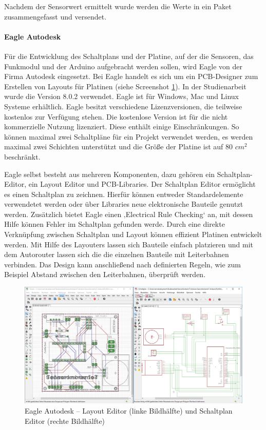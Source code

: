 Nachdem der Sensorwert ermittelt wurde werden die Werte in ein Paket zusammengefasst und versendet.  
\paragraph{Eagle Autodesk} Für die Entwicklung des Schaltplans und der Platine, auf der die Sensoren,  das Funkmodul und der Arduino aufgebracht werden sollen, wird Eagle von der Firma Autodesk eingesetzt. Bei Eagle handelt es sich um ein \ac{PCB}-Designer zum Erstellen von Layouts für Platinen (siehe Screenshot \ref{img:EagleAutodesk}). In der Studienarbeit wurde die Version 8.0.2 verwendet. Eagle ist für Windows, Mac und Linux Systeme erhältlich. Eagle besitzt verschiedene Lizenzversionen, die teilweise kostenlos zur Verfügung stehen. Die kostenlose Version ist für die nicht kommerzielle Nutzung lizenziert. Diese enthält einige Einschränkungen. So können maximal zwei Schaltpläne für ein Projekt verwendet werden, es werden maximal zwei Schichten unterstützt und die Größe der Platine ist auf 80 $cm^{2}$ beschränkt.

Eagle selbst besteht aus mehreren Komponenten, dazu gehören ein Schaltplan-Editor, ein Layout Editor und \ac{PCB}-Libraries. Der Schaltplan Editor ermöglicht es einen Schaltplan zu zeichnen. Hierfür können entweder Standardelemente verwendetet werden oder über Libraries neue elektronische Bauteile genutzt werden. Zusätzlich bietet Eagle einen ‚Electrical Rule Checking‘ an, mit dessen Hilfe können Fehler im Schaltplan gefunden werde. Durch eine direkte Verknüpfung zwischen Schaltplan und Layout können effizient Platinen entwickelt werden. Mit Hilfe des Layouters lassen sich Bauteile einfach platzieren und mit dem Autorouter lassen sich die die einzelnen Bauteile mit Leiterbahnen verbinden. Das Design kann anschließend nach definierten Regeln, wie zum Beispiel Abstand zwischen den Leiterbahnen, überprüft werden. 
\begin{figure}
	\centering
	\includegraphics[width=1\textwidth]{bilder/Eagle.png}
	\caption[Eagle Autodesk – Layout Editor und Schaltplan Editor]{Eagle Autodesk – Layout Editor (linke Bildhälfte) und Schaltplan Editor (rechte Bildhälfte)}
	\label{img:EagleAutodesk}
\end{figure}
